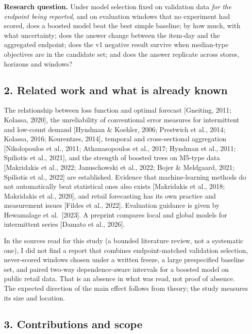 \documentclass[
]{article}
\begin{document}
\textbf{Research question.} Under model selection fixed on validation
data \emph{for the endpoint being reported}, and on evaluation windows
that no experiment had scored, does a boosted model beat the best simple
baseline; by how much, with what uncertainty; does the answer change
between the item-day and the aggregated endpoint; does the v1 negative
result survive when median-type objectives are in the candidate set; and
does the answer replicate across stores, horizons and windows?

\subsection{2. Related work and what is already
known}\label{related-work-and-what-is-already-known}

The relationship between loss function and optimal forecast {[}Gneiting,
2011; Kolassa, 2020{]}, the unreliability of conventional error measures
for intermittent and low-count demand {[}Hyndman \& Koehler, 2006;
Prestwich et al., 2014; Kolassa, 2016; Kourentzes, 2014{]}, temporal and
cross-sectional aggregation {[}Nikolopoulos et al., 2011; Athanasopoulos
et al., 2017; Hyndman et al., 2011; Spiliotis et al., 2021{]}, and the
strength of boosted trees on M5-type data {[}Makridakis et al., 2022;
Januschowski et al., 2022; Bojer \& Meldgaard, 2021; Spiliotis et al.,
2022{]} are established. Evidence that machine-learning methods do not
automatically beat statistical ones also exists {[}Makridakis et al.,
2018; Makridakis et al., 2020{]}, and retail forecasting has its own
practice and measurement issues {[}Fildes et al., 2022{]}. Evaluation
guidance is given by Hewamalage et al.~{[}2023{]}. A preprint compares
local and global models for intermittent series {[}Damato et al.,
2026{]}.

In the sources read for this study (a bounded literature review, not a
systematic one), I did not find a report that combines endpoint-matched
validation selection, never-scored windows chosen under a written
freeze, a large prespecified baseline set, and paired two-way
dependence-aware intervals for a boosted model on public retail data.
That is an absence in what was read, not proof of absence. The expected
direction of the main effect follows from theory; the study measures its
size and location.

\subsection{3. Contributions and scope}\label{contributions-and-scope}
\end{document}
